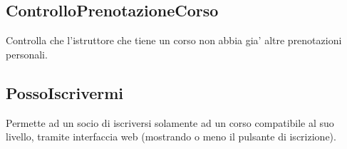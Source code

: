 \subsection{ControlloPrenotazioneCorso}



Controlla che l'istruttore che tiene un corso non abbia gia' altre prenotazioni personali.

\newpage
\subsection{PossoIscrivermi}



Permette ad un socio di iscriversi solamente ad un corso compatibile al suo livello, tramite interfaccia web (mostrando o meno il pulsante di iscrizione).